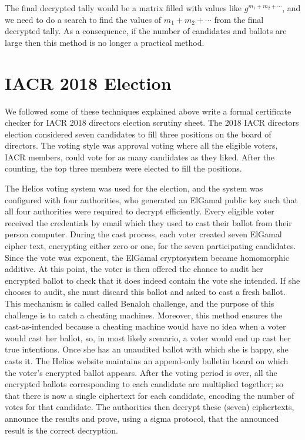 \noindent 
The final decrypted tally would be a matrix filled with values like $g^{m_{1} + m_{2} + \cdots }$, and we 
need to do a search to find the values of $m_{1} + m_{2} + \cdots$ from the 
final decrypted tally. As a consequence, if the number of candidates and ballots are large then 
this method is no longer a practical method. 

\section{IACR 2018 Election}
\label{sec:election_iacr}
We followed some of these techniques explained above write a formal 
certificate checker for  IACR 2018 directors election scrutiny sheet.  
The 2018  IACR directors election considered seven 
 candidates to fill three positions on the board of directors.   The voting 
 style was approval voting where all the eligible voters, IACR members, 
 could vote for as many candidates as they liked. After the counting, 
 the top three members were elected to fill the positions. 
 
The Helios voting system \citep{Helios:2016:HVS}  was used for the election, and the system
was configured with four authorities, who generated an ElGamal \citep{elgamal1985public}  public
key such that all four authorities were required to decrypt efficiently.    
Every eligible voter received the credentials by email which they used 
to cast their ballot from their person computer. 
During the cast process, each voter created seven ElGamal cipher text, 
encrypting either zero or one, for the seven participating candidates. 
Since the vote was exponent, the ElGamal cryptosystem became 
homomorphic additive. At this point,  the voter is then offered the chance to audit 
her encrypted ballot to check that
it does indeed contain the vote she intended. If she chooses to audit, she must
discard this ballot and asked to  cast 
a fresh ballot. This mechanism is called called Benaloh challenge, 
and the purpose of this challenge is to catch a cheating machines. 
Moreover, this method ensures the cast-as-intended because 
a cheating machine would have no idea when a voter would 
cast her ballot, so, in most likely scenario, a voter would 
end up cast her true intentions. Once she has an 
unaudited ballot with which she is happy, she casts it. 
The Helios website maintains an append-only bulletin board on which the voter's
encrypted ballot appears.  
After the voting period is over,
all the encrypted ballots corresponding to each candidate are multiplied together; so that there is 
now a single ciphertext for each candidate, encoding the number of votes for
that candidate.  The authorities then decrypt 
these (seven) ciphertexts, announce the results and prove,
using a sigma protocol, that the announced result is the 
correct decryption.


